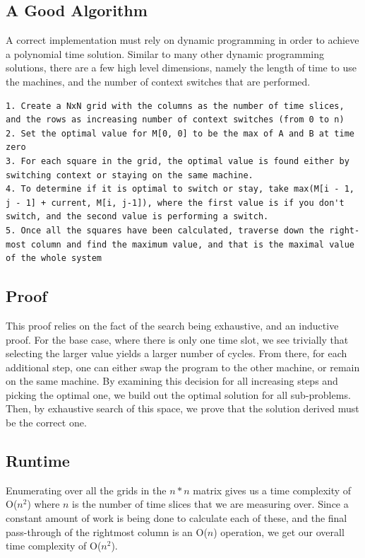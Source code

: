 \documentclass[titlepage]{article}
\numberwithin{equation}{subsection}
\begin{document}
\subsection{A Good Algorithm}
A correct implementation must rely on dynamic programming in order to achieve a polynomial time solution. Similar to many other
dynamic programming solutions, there are a few high level dimensions, namely the length of time to use the machines, and the number
of context switches that are performed. 
\\
\begin{lstlisting}
1. Create a NxN grid with the columns as the number of time slices, and the rows as increasing number of context switches (from 0 to n)
2. Set the optimal value for M[0, 0] to be the max of A and B at time zero
3. For each square in the grid, the optimal value is found either by switching context or staying on the same machine.
4. To determine if it is optimal to switch or stay, take max(M[i - 1, j - 1] + current, M[i, j-1]), where the first value is if you don't switch, and the second value is performing a switch.
5. Once all the squares have been calculated, traverse down the right-most column and find the maximum value, and that is the maximal value of the whole system
\end{lstlisting}
\subsection{Proof}
This proof relies on the fact of the search being exhaustive, and an inductive proof. For the base case, where there is only one time slot,
we see trivially that selecting the larger value yields a larger number of cycles. From there, for each additional step, one can either swap
the program to the other machine, or remain on the same machine. By examining this decision for all increasing steps and picking the optimal one,
we build out the optimal solution for all sub-problems. Then, by exhaustive search of this space, we prove that the solution derived must be
the correct one.
\subsection{Runtime}
Enumerating over all the grids in the $n*n$ matrix gives us a time complexity of O($n^2$) where $n$ is the number of time slices that
we are measuring over. Since a constant amount of work is being done to calculate each of these, and the final pass-through of the rightmost
column is an O($n$) operation, we get our overall time complexity of O($n^2$).
\end{document}
